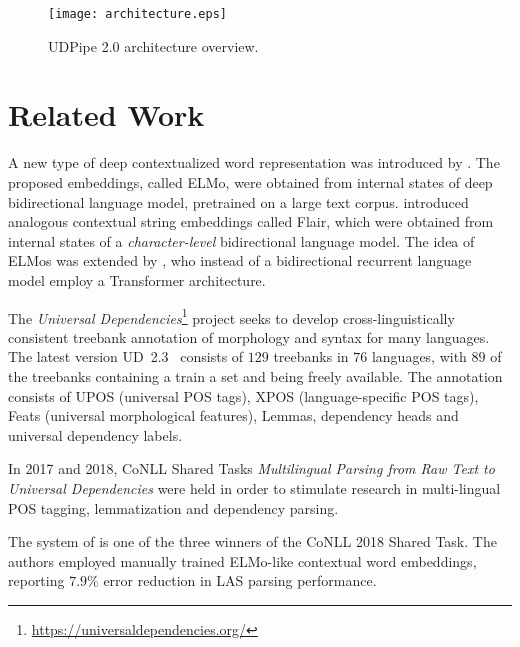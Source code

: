 \documentclass[11pt,a4paper]{article}
\begin{document}
\begin{figure*}[t]
  \begin{center}
    \texttt{[image: architecture.eps]}
  \end{center}
  \caption{UDPipe 2.0 architecture overview.}
  \label{figure:udpipe}
\end{figure*}

\section{Related Work}
\label{section:related_work}

A new type of deep contextualized word representation was introduced by
\citet{Peters2018}. The proposed embeddings, called ELMo, were obtained from
internal states of deep bidirectional language model, pretrained on a large
text corpus. \citet{Akbik} introduced analogous contextual string
embeddings called Flair, which were obtained from internal states of
a \emph{character-level} bidirectional language model. The idea of ELMos was
extended by \citet{BERT}, who instead of a bidirectional recurrent language
model employ a Transformer \citep{vaswani:2017} architecture.

The \emph{Universal
Dependencies}\footnote{\scriptsize\url{https://universaldependencies.org/}}
project \citep{ud} seeks to develop cross-linguistically consistent treebank
annotation of morphology and syntax for many languages.  The latest version
UD~2.3~\citep{ud23} consists of $129$ treebanks in $76$ languages,
with $89$ of the treebanks containing a train a set and being freely available.
The annotation consists of UPOS (universal POS tags), XPOS (language-specific
POS tags), Feats (universal morphological features), Lemmas, dependency heads
and universal dependency labels.

In 2017 and 2018, CoNLL Shared Tasks \emph{Multilingual Parsing from Raw Text
to Universal Dependencies} \cite{CoNLL2017,CoNLL2018} were held in order to
stimulate research in multi-lingual POS tagging, lemmatization and dependency
parsing.

The system of \citet{udst18:harbin} is one of the three winners of the CoNLL
2018 Shared Task. The authors employed manually trained ELMo-like contextual
word embeddings, reporting $7.9\%$ error reduction in LAS parsing performance.
\end{document}
